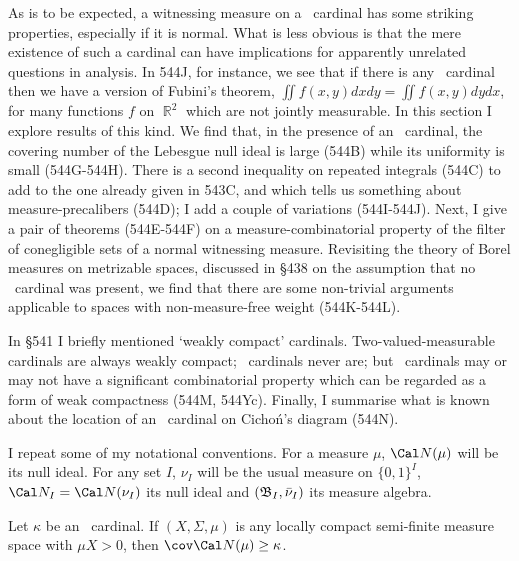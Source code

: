 

\def\chaptername{Real-valued-measurable cardinals}
\def\sectionname{Measure theory with an \am\ cardinal}

\def\CalUn{\Cal{U}\eurm{n}}


As is to be expected, a witnessing measure on a \rvm\ cardinal has some
striking properties, especially if it is normal.   What is less obvious is
that the mere existence of such a cardinal can have implications for
apparently unrelated questions in analysis.   In 544J, for instance, we see
that if there is any \am\ cardinal then we have a version of Fubini's
theorem, $\iint f(x,y)dxdy=\iint f(x,y)dydx$, for many functions $f$
on $\BbbR^2$ which are not jointly measurable.
In this section I explore results of this
kind.   We find that, in the presence of an \am\ cardinal, the
covering number of the Lebesgue null ideal is large (544B) while
its uniformity is small (544G-544H).
There is a second inequality on repeated integrals (544C) to add to the
one already given in 543C, and which tells us
something about measure-precalibers (544D);  I add a couple of variations
(544I-544J).    Next, I give a pair of
theorems (544E-544F) on a measure-combinatorial property of the filter of
conegligible sets of a normal witnessing measure.   Revisiting the theory
of Borel measures on metrizable spaces, discussed in \S438 on the
assumption that no \rvm\ cardinal was present, we find that there are some
non-trivial arguments applicable to spaces with non-measure-free
weight (544K-544L).

In \S541 I briefly mentioned `weakly compact' cardinals.
Two-valued-measurable cardinals
are always weakly compact;  \am\ cardinals never are;  but \am\ cardinals
may or may not have a significant combinatorial property which can be
regarded as a form of weak compactness (544M, 544Yc).   Finally,
I summarise what is known about the location of an \am\ cardinal on
Cicho\'n's diagram (544N).

 I repeat some of my notational conventions.
For a measure $\mu$, $\Cal N(\mu)$ will be its null ideal.
For any set $I$, $\nu_I$ will be the usual measure on $\{0,1\}^I$,
$\Cal N_I=\Cal N(\nu_I)$ its null ideal and $(\frak B_I,\bar\nu_I)$ its
measure algebra.

 Let $\kappa$ be an \am\ cardinal.
If $(X,\Sigma,\mu)$ is any locally compact
semi-finite measure space with $\mu X>0$, then
$\cov\Cal N(\mu)\penalty-100\ge\kappa$.


